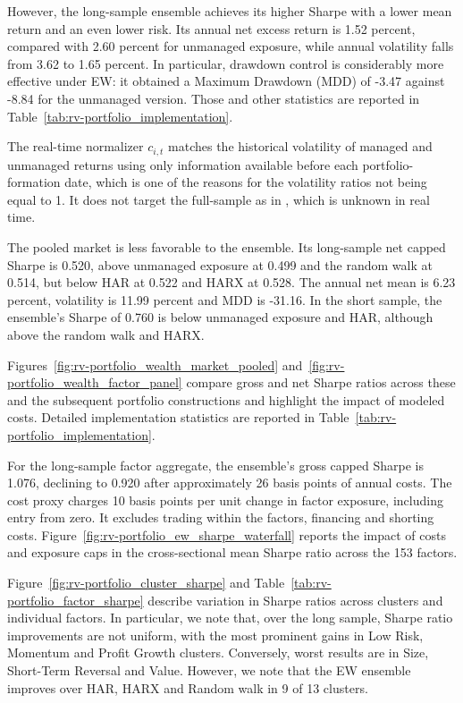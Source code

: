 \documentclass[preprint,12pt,authoryear]{elsarticle}
\begin{document}
 However, the long-sample ensemble achieves its higher Sharpe with a lower mean return and an even lower risk. Its annual net excess return is 1.52 percent, compared with 2.60 percent for unmanaged exposure, while annual volatility falls from 3.62 to 1.65 percent. In particular, drawdown control is considerably more effective under EW: it obtained a Maximum Drawdown (MDD) of -3.47 against -8.84 for the unmanaged version. Those and other statistics are reported in Table~\ref{tab:rv-portfolio_implementation}. 

The real-time normalizer $c_{i,t}$ matches the historical volatility of managed and unmanaged returns using only information available before each portfolio-formation date, which is one of the reasons for the volatility ratios not being equal to 1. It does not target the full-sample as in \citet{moreiramuir2017}, which is unknown in real time. 

The pooled market is less favorable to the ensemble. Its long-sample net capped Sharpe is 0.520, above unmanaged exposure at 0.499 and the random walk at 0.514, but below HAR at 0.522 and HARX at 0.528. The annual net mean is 6.23 percent, volatility is 11.99 percent and MDD is -31.16. In the short sample, the ensemble's Sharpe of 0.760 is below unmanaged exposure and HAR, although above the random walk and HARX. 

Figures~\ref{fig:rv-portfolio_wealth_market_pooled} and~\ref{fig:rv-portfolio_wealth_factor_panel} compare gross and net Sharpe ratios across these and the subsequent portfolio constructions and highlight the impact of modeled costs. Detailed implementation statistics are reported in Table~\ref{tab:rv-portfolio_implementation}. 

For the long-sample factor aggregate, the ensemble's gross capped Sharpe is 1.076, declining to 0.920 after approximately 26 basis points of annual costs. The cost proxy charges 10 basis points per unit change in factor exposure, including entry from zero. It excludes trading within the factors, financing and shorting costs.  Figure~\ref{fig:rv-portfolio_ew_sharpe_waterfall} reports the impact of costs and exposure caps in the cross-sectional mean Sharpe ratio across the 153 factors.

Figure~\ref{fig:rv-portfolio_cluster_sharpe} and Table~\ref{tab:rv-portfolio_factor_sharpe} describe variation in Sharpe ratios across clusters and individual factors. In particular, we note that, over the long sample, Sharpe ratio improvements are not uniform, with the most prominent gains in Low Risk, Momentum and Profit Growth clusters. Conversely, worst results are in Size, Short-Term Reversal and Value. However, we note that the EW ensemble improves over HAR, HARX and Random walk in 9 of 13 clusters.
\end{document}
